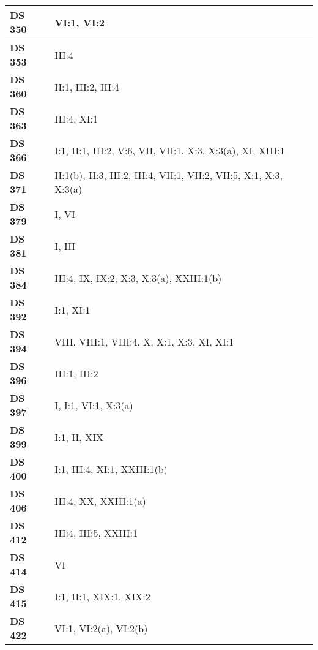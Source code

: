 \begin{xltabular}{\linewidth}{ l | X }
    \textbf {DS 350} & VI:1, VI:2 \\ \hline

    \textbf {DS 353} & III:4 \\ \hline

    \textbf {DS 360} & II:1, III:2, III:4 \\ \hline

    \textbf {DS 363} & III:4, XI:1 \\ \hline

    \textbf {DS 366} & I:1, II:1, III:2, V:6, VII, VII:1, X:3, X:3(a), XI, XIII:1 \\ \hline

    \textbf {DS 371} & II:1(b), II:3, III:2, III:4, VII:1, VII:2, VII:5, X:1, X:3, X:3(a) \\ \hline

    \textbf {DS 379} & I, VI \\ \hline

    \textbf {DS 381} & I, III \\ \hline

    \textbf {DS 384} & III:4, IX, IX:2, X:3, X:3(a), XXIII:1(b) \\ \hline

    \textbf {DS 392} & I:1, XI:1 \\ \hline

    \textbf {DS 394} & VIII, VIII:1, VIII:4, X, X:1, X:3, XI, XI:1 \\ \hline

    \textbf {DS 396} & III:1, III:2 \\ \hline

    \textbf {DS 397} & I, I:1, VI:1, X:3(a) \\ \hline

    \textbf {DS 399} & I:1, II, XIX \\ \hline

    \textbf {DS 400} & I:1, III:4, XI:1, XXIII:1(b) \\ \hline

    \textbf {DS 406} & III:4, XX, XXIII:1(a) \\ \hline

    \textbf {DS 412} & III:4, III:5, XXIII:1 \\ \hline

    \textbf {DS 414} & VI \\ \hline

    \textbf {DS 415} & I:1, II:1, XIX:1, XIX:2 \\ \hline

    \textbf {DS 422} & VI:1, VI:2(a), VI:2(b) \\ \hline


\end{xltabular}
